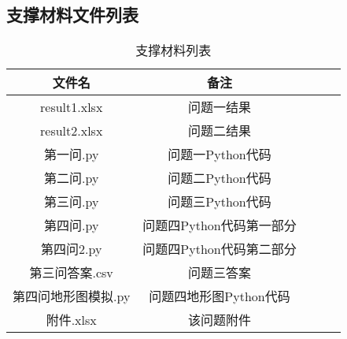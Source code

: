 \documentclass[withoutpreface,bwprint]{cumcmthesis} %
\begin{document}
\newpage
\begin{appendices}
\section{支撑材料文件列表}
\begin{table}[!htbp]
    \caption{支撑材料列表}\label{tab:001} \centering
    \begin{tabular}{ccccc}
        \toprule[1.5pt]
        文件名 & 备注\\
        \midrule[1pt]
        result1.xlsx&问题一结果\\
	result2.xlsx&问题二结果\\
	第一问.py&问题一Python代码\\
	第二问.py&问题二Python代码\\
	第三问.py&问题三Python代码\\
	第四问.py&问题四Python代码第一部分\\
	第四问2.py&问题四Python代码第二部分\\
	第三问答案.csv&问题三答案\\
	第四问地形图模拟.py&问题四地形图Python代码\\
	附件.xlsx&该问题附件\\
        \bottomrule[1.5pt]
    \end{tabular}
\end{table}


\end{appendices}
\end{document}
